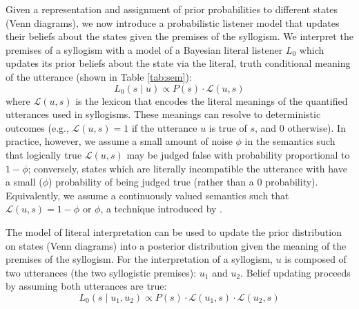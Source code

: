 \documentclass[floatsintext, doc]{apa6}
\begin{document}
Given a representation and assignment of prior probabilities to different states (Venn diagrams), we now introduce a probabilistic listener model that updates their beliefs about the states given the premises of the syllogism. 
We interpret the premises of a syllogism with a model of a Bayesian literal listener $L_0$ which updates its prior beliefs about the state via the literal, truth conditional meaning of the utterance (shown in Table \ref{tab:sem}):
\begin{equation}
L_0(s \mid u ) \propto P(s)\cdot \mathcal{L}(u, s) 
\label{eq:L0}
\end{equation}
\noindent where $\mathcal{L}(u, s)$ is the lexicon that encodes the literal meanings of the quantified utterances used in syllogisms. 
These meanings can resolve to deterministic outcomes (e.g., $\mathcal{L}(u, s) = 1$ if the utterance $u$ is true of $s$, and 0 otherwise). 
In practice, however, we assume a small amount of noise $\phi$ in the semantics such that logically true $\mathcal{L}(u, s)$ may be judged false with probability proportional to $1-\phi$; conversely, states which are literally incompatible the utterance with have a small ($\phi$) probability of being judged true (rather than a 0 probability).
Equivalently, we assume a continuously valued semantics such that $\mathcal{L}(u, s) = 1-\phi$ or $\phi$, a technique introduced by .


The model of literal interpretation can be used to update the prior distribution on states (Venn diagrams) into a posterior distribution given the meaning of the premises of the syllogism. 
For the interpretation of a syllogism, $u$ is composed of two utterances (the two syllogistic premises): $u_1$ and $u_2$. 
Belief updating proceeds by assuming both utterances are true: 
\begin{equation}
L_0(s \mid u_1,  u_2) \propto P(s)\cdot \mathcal{L}(u_1, s) \cdot \mathcal{L}(u_2, s) 
\label{eq:L0premises}
\end{equation}
\end{document}
